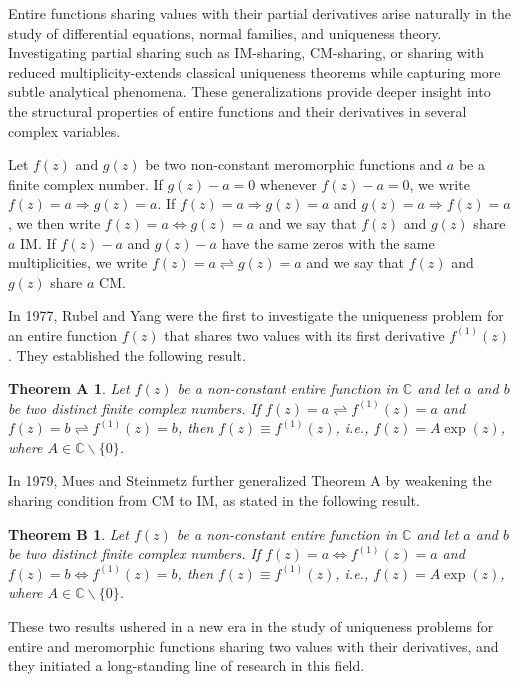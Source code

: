 \documentclass[11pt, reqno]{amsart}
\newtheorem*{theoA}{Theorem A}
\newtheorem*{theoB}{Theorem B}
\newtheorem*{cor A}{Corollary A}
\newtheorem*{cor B}{Corollary B}
\numberwithin{equation}{section}
\begin{document}
\smallskip
Entire functions sharing values with their partial derivatives arise naturally in the study of differential equations, normal families, and uniqueness theory. Investigating partial sharing such as IM-sharing, CM-sharing, or sharing with reduced multiplicity-extends classical uniqueness theorems while capturing more subtle analytical phenomena. These generalizations provide deeper insight into the structural properties of entire functions and their derivatives in several complex variables.
 
\medskip
Let $f(z)$ and $g(z)$ be two non-constant meromorphic functions and $a$ be a finite complex number. If $g(z)-a=0$ whenever $f(z)-a=0$, we write $f(z)=a\Rightarrow g(z)=a$. If $f(z)=a\Rightarrow g(z)=a$ and $g(z)=a\Rightarrow f(z)=a$, we then write $f(z)=a\Leftrightarrow g(z)=a$ and we say that $f(z)$ and $g(z)$ share $a$ IM. If $f(z)-a$ and $g(z)-a$ have the same zeros with the same multiplicities, we write $f(z)=a\rightleftharpoons g(z)=a$ and we say that $f(z)$ and $g(z)$ share $a$ CM.\par


\medskip
In 1977, Rubel and Yang \cite{Rubel-Yang-1977} were the first to investigate the uniqueness problem for an entire function $f(z)$ that shares two values with its first derivative $f^{(1)}(z)$. They established the following result.

\begin{theoA}\cite{Rubel-Yang-1977} Let $f(z)$ be a non-constant entire function in $\mathbb{C}$ and let $a$ and $b$ be two distinct finite complex numbers. If $f(z)=a\rightleftharpoons f^{(1)}(z)=a$ and $f(z)=b\rightleftharpoons f^{(1)}(z)=b$, then $f(z)\equiv f^{(1)}(z)$, i.e., $f(z)=A\exp(z)$, where $A\in\mathbb{C}\backslash \{0\}$.
\end{theoA} 

\medskip
In 1979, Mues and Steinmetz \cite{Mues-Steinmetz-1979} further generalized Theorem A by weakening the sharing condition from CM to IM, as stated in the following result.
\begin{theoB}\cite[Satz 1]{Mues-Steinmetz-1979} Let $f(z)$ be a non-constant entire function in $\mathbb{C}$ and let $a$ and $b$ be two distinct finite complex numbers. If $f(z)=a\Leftrightarrow f^{(1)}(z)=a$ and $f(z)=b\Leftrightarrow f^{(1)}(z)=b$, then $f(z)\equiv f^{(1)}(z)$, i.e., $f(z)=A\exp(z)$, where $A\in\mathbb{C}\backslash \{0\}$.
\end{theoB} 

These two results ushered in a new era in the study of uniqueness problems for entire and meromorphic functions sharing two values with their derivatives, and they initiated a long-standing line of research in this field.
\end{document}
